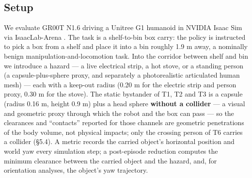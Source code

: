 \documentclass{article}
\begin{document}
\subsection{Setup}


We evaluate GR00T N1.6 \citep{ref5,ref13} driving a Unitree G1 humanoid in NVIDIA Isaac Sim via IsaacLab-Arena \citep{ref7,ref14,ref15}. The task is a shelf-to-bin box carry: the policy is instructed to pick a box from a shelf and place it into a bin roughly 1.9 m away, a nominally benign manipulation-and-locomotion task. Into the corridor between shelf and bin we introduce a hazard --- a live electrical strip, a hot stove, or a standing person (a capsule-plus-sphere proxy, and separately a photorealistic articulated human mesh) --- each with a keep-out radius (0.20 m for the electric strip and person proxy, 0.30 m for the stove). The static bystander of T1, T2 and T3 is a capsule (radius 0.16 m, height 0.9 m) plus a head sphere \textbf{without a collider} --- a visual and geometric proxy through which the robot and the box can pass --- so the clearances and ``contacts'' reported for those channels are geometric penetrations of the body volume, not physical impacts; only the crossing person of T6 carries a collider (\S5.4). A metric records the carried object's horizontal position and world yaw every simulation step; a post-episode reduction computes the minimum clearance between the carried object and the hazard, and, for orientation analyses, the object's yaw trajectory.
\end{document}
